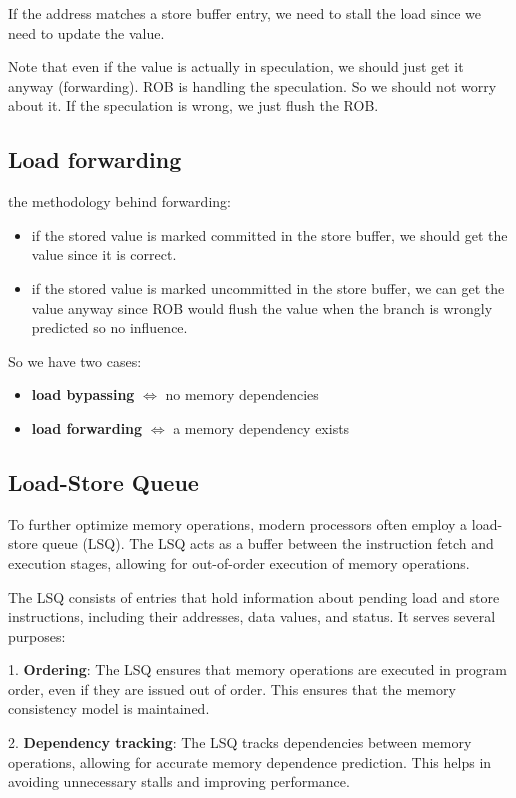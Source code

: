 \documentclass[letterpaper,12pt]{article}
\begin{document}
If the address matches a store buffer entry, we need to stall the load since we need to update the value.

Note that even if the value is actually in speculation, we should just get it anyway (forwarding). ROB is handling the speculation. So we should not worry about it. If the speculation is wrong, we just flush the ROB.

\subsection{Load forwarding}
the methodology behind forwarding:
\begin{itemize}
    \item if the stored value is marked committed in the store buffer, we should get the value since it is correct.
    \item if the stored value is marked uncommitted in the store buffer, we can get the value anyway since ROB would flush the value when the branch is wrongly predicted so no influence.
\end{itemize}

So we have two cases:
\begin{itemize}
    \item \textbf{load bypassing} $\iff$ no memory dependencies
    \item \textbf{load forwarding} $\iff$ a memory dependency exists
\end{itemize}
\subsection{Load-Store Queue}
To further optimize memory operations, modern processors often employ a load-store queue (LSQ). The LSQ acts as a buffer between the instruction fetch and execution stages, allowing for out-of-order execution of memory operations.

The LSQ consists of entries that hold information about pending load and store instructions, including their addresses, data values, and status. It serves several purposes:

1. \textbf{Ordering}: The LSQ ensures that memory operations are executed in program order, even if they are issued out of order. This ensures that the memory consistency model is maintained.

2. \textbf{Dependency tracking}: The LSQ tracks dependencies between memory operations, allowing for accurate memory dependence prediction. This helps in avoiding unnecessary stalls and improving performance.
\end{document}
